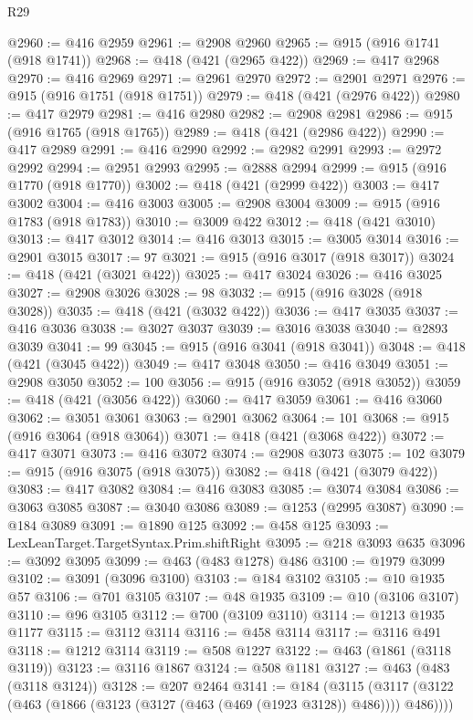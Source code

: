 \begin{lexlean}{R29}
\begin{coremodule}
@2960 := @416 @2959
@2961 := @2908 @2960
@2965 := @915 (@916 @1741 (@918 @1741))
@2968 := @418 (@421 (@2965 @422))
@2969 := @417 @2968
@2970 := @416 @2969
@2971 := @2961 @2970
@2972 := @2901 @2971
@2976 := @915 (@916 @1751 (@918 @1751))
@2979 := @418 (@421 (@2976 @422))
@2980 := @417 @2979
@2981 := @416 @2980
@2982 := @2908 @2981
@2986 := @915 (@916 @1765 (@918 @1765))
@2989 := @418 (@421 (@2986 @422))
@2990 := @417 @2989
@2991 := @416 @2990
@2992 := @2982 @2991
@2993 := @2972 @2992
@2994 := @2951 @2993
@2995 := @2888 @2994
@2999 := @915 (@916 @1770 (@918 @1770))
@3002 := @418 (@421 (@2999 @422))
@3003 := @417 @3002
@3004 := @416 @3003
@3005 := @2908 @3004
@3009 := @915 (@916 @1783 (@918 @1783))
@3010 := @3009 @422
@3012 := @418 (@421 @3010)
@3013 := @417 @3012
@3014 := @416 @3013
@3015 := @3005 @3014
@3016 := @2901 @3015
@3017 := 97
@3021 := @915 (@916 @3017 (@918 @3017))
@3024 := @418 (@421 (@3021 @422))
@3025 := @417 @3024
@3026 := @416 @3025
@3027 := @2908 @3026
@3028 := 98
@3032 := @915 (@916 @3028 (@918 @3028))
@3035 := @418 (@421 (@3032 @422))
@3036 := @417 @3035
@3037 := @416 @3036
@3038 := @3027 @3037
@3039 := @3016 @3038
@3040 := @2893 @3039
@3041 := 99
@3045 := @915 (@916 @3041 (@918 @3041))
@3048 := @418 (@421 (@3045 @422))
@3049 := @417 @3048
@3050 := @416 @3049
@3051 := @2908 @3050
@3052 := 100
@3056 := @915 (@916 @3052 (@918 @3052))
@3059 := @418 (@421 (@3056 @422))
@3060 := @417 @3059
@3061 := @416 @3060
@3062 := @3051 @3061
@3063 := @2901 @3062
@3064 := 101
@3068 := @915 (@916 @3064 (@918 @3064))
@3071 := @418 (@421 (@3068 @422))
@3072 := @417 @3071
@3073 := @416 @3072
@3074 := @2908 @3073
@3075 := 102
@3079 := @915 (@916 @3075 (@918 @3075))
@3082 := @418 (@421 (@3079 @422))
@3083 := @417 @3082
@3084 := @416 @3083
@3085 := @3074 @3084
@3086 := @3063 @3085
@3087 := @3040 @3086
@3089 := @1253 (@2995 @3087)
@3090 := @184 @3089
@3091 := @1890 @125
@3092 := @458 @125
@3093 := LexLeanTarget.TargetSyntax.Prim.shiftRight
@3095 := @218 @3093 @635
@3096 := @3092 @3095
@3099 := @463 (@483 @1278) @486
@3100 := @1979 @3099
@3102 := @3091 (@3096 @3100)
@3103 := @184 @3102
@3105 := @10 @1935 @57
@3106 := @701 @3105
@3107 := @48 @1935
@3109 := @10 (@3106 @3107)
@3110 := @96 @3105
@3112 := @700 (@3109 @3110)
@3114 := @1213 @1935 @1177
@3115 := @3112 @3114
@3116 := @458 @3114
@3117 := @3116 @491
@3118 := @1212 @3114
@3119 := @508 @1227
@3122 := @463 (@1861 (@3118 @3119))
@3123 := @3116 @1867
@3124 := @508 @1181
@3127 := @463 (@483 (@3118 @3124))
@3128 := @207 @2464
@3141 := @184
    (@3115 (@3117 (@3122 (@463 (@1866 (@3123 (@3127 (@463 (@469 (@1923 @3128)) @486)))) @486))))

\end{coremodule}
\end{lexlean}
